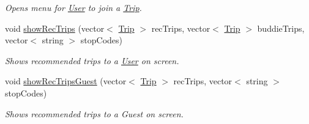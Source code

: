 \begin{Indent}
\begin{DoxyCompactItemize}
\begin{DoxyCompactList}\small\item\em Opens menu for \hyperlink{class_user}{User} to join a \hyperlink{class_trip}{Trip}. \end{DoxyCompactList}\item 
void \hyperlink{group___agency_gabc352c6cad4e22817e2a52a0e756e295}{show\+Rec\+Trips} (vector$<$ \hyperlink{class_trip}{Trip} $>$ rec\+Trips, vector$<$ \hyperlink{class_trip}{Trip} $>$ buddie\+Trips, vector$<$ string $>$ stop\+Codes)
\begin{DoxyCompactList}\small\item\em Shows recommended trips to a \hyperlink{class_user}{User} on screen. \end{DoxyCompactList}\item 
void \hyperlink{group___agency_ga7cde2e6cef7a7e4dbcb84af39a8caa34}{show\+Rec\+Trips\+Guest} (vector$<$ \hyperlink{class_trip}{Trip} $>$ rec\+Trips, vector$<$ string $>$ stop\+Codes)
\begin{DoxyCompactList}\small\item\em Shows recommended trips to a Guest on screen. \end{DoxyCompactList}\end{DoxyCompactItemize}
\end{Indent}
